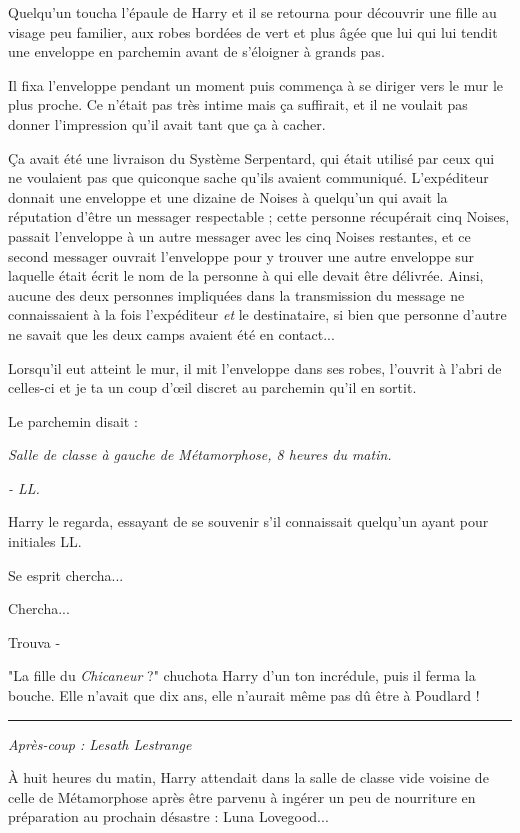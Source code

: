Quelqu'un toucha l'épaule de Harry et il se retourna pour découvrir une fille au visage peu familier, aux robes bordées de vert et plus âgée que lui qui lui tendit une enveloppe en parchemin avant de s'éloigner à grands pas.

Il fixa l'enveloppe pendant un moment puis commença à se diriger vers le mur le plus proche. Ce n'était pas très intime mais ça suffirait, et il ne voulait pas donner l'impression qu'il avait tant que ça à cacher.

Ça avait été une livraison du Système Serpentard, qui était utilisé par ceux qui ne voulaient pas que quiconque sache qu'ils avaient communiqué. L'expéditeur donnait une enveloppe et une dizaine de Noises à quelqu'un qui avait la réputation d'être un messager respectable ; cette personne récupérait cinq Noises, passait l'enveloppe à un autre messager avec les cinq Noises restantes, et ce second messager ouvrait l'enveloppe pour y trouver une autre enveloppe sur laquelle était écrit le nom de la personne à qui elle devait être délivrée. Ainsi, aucune des deux personnes impliquées dans la transmission du message ne connaissaient à la fois l'expéditeur \emph{et}  le destinataire, si bien que personne d'autre ne savait que les deux camps avaient été en contact...

Lorsqu'il eut atteint le mur, il mit l'enveloppe dans ses robes, l'ouvrit à l'abri de celles-ci et je ta un coup d'œil discret au parchemin qu'il en sortit.

Le parchemin disait :

\emph{Salle de classe à gauche de Métamorphose, 8 heures du matin.} 

\emph{- LL.} 

Harry le regarda, essayant de se souvenir s'il connaissait quelqu'un ayant pour initiales LL.

Se esprit chercha...

Chercha...

Trouva -

"La fille du \emph{Chicaneur } ?" chuchota Harry d'un ton incrédule, puis il ferma la bouche. Elle n'avait que dix ans, elle n'aurait même pas dû être à Poudlard !
\par\noindent\rule{\textwidth}{0.4pt}
\emph{Après-coup : Lesath Lestrange} 

À huit heures du matin, Harry attendait dans la salle de classe vide voisine de celle de Métamorphose après être parvenu à ingérer un peu de nourriture en préparation au prochain désastre : Luna Lovegood...

